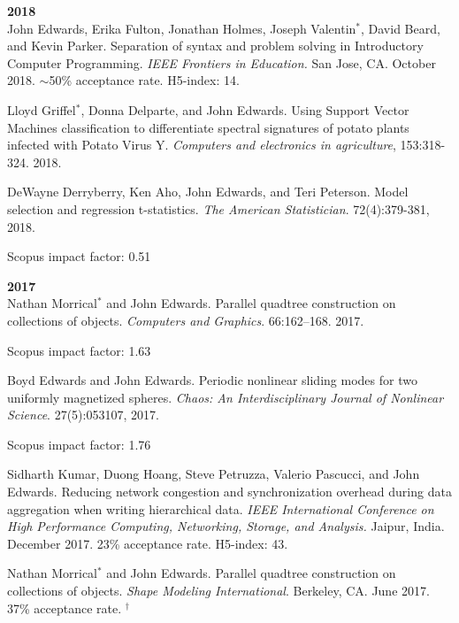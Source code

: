 \documentclass[margin,line]{res}
\newcommand{\pubunder}[1]{#1}
\begin{document}
\begin{resume}
\textbf{2018} \\
John Edwards, Erika Fulton, Jonathan Holmes, Joseph Valentin$^*$, David Beard, and Kevin Parker. Separation of syntax and problem solving in Introductory Computer Programming. \textit{IEEE Frontiers in Education.} San Jose, CA. October 2018.  $\sim$50\% acceptance rate. H5-index: 14.

Lloyd Griffel$^*$, Donna Delparte, and John Edwards. Using Support Vector Machines classification to differentiate spectral signatures of potato plants infected with Potato Virus Y. \textit{Computers and electronics in agriculture}, 153:318-324. 2018.

DeWayne Derryberry, Ken Aho, \pubunder{John Edwards}, and Teri Peterson. Model selection and regression t-statistics. \textit{The American Statistician}. 72(4):379-381, 2018.
\begin{IMPACT}
Scopus impact factor: 0.51 %
\end{IMPACT}

\textbf{2017} \\
Nathan Morrical$^*$ and \pubunder{John Edwards}. Parallel quadtree construction on collections of objects. \textit{Computers and Graphics}. 66:162–168. 2017.
\begin{IMPACT}
Scopus impact factor: 1.63 %
\end{IMPACT}

Boyd Edwards and \pubunder{John Edwards}. Periodic nonlinear sliding modes for two uniformly magnetized spheres. \textit{Chaos: An Interdisciplinary Journal of Nonlinear Science}. 27(5):053107, 2017.
\begin{IMPACT}
Scopus impact factor: 1.76 %
\end{IMPACT}

Sidharth Kumar, Duong Hoang, Steve Petruzza, Valerio Pascucci, and \pubunder{John Edwards}. Reducing network congestion and synchronization overhead during data aggregation when writing hierarchical data. \textit{IEEE International Conference on High Performance Computing, Networking, Storage, and Analysis.} Jaipur, India. December 2017. 23\% acceptance rate. H5-index: 43.

Nathan Morrical$^*$ and \pubunder{John Edwards}. Parallel quadtree construction on collections of objects. \textit{Shape Modeling International}. Berkeley, CA. June 2017. 37\% acceptance rate.
$^\dagger$


\end{resume}
\end{document}
